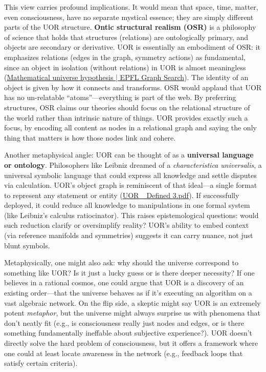 \documentclass[12pt]{article}
\begin{document}
This view carries profound implications. It would mean that space, time, matter, even consciousness, have no separate mystical essence; they are simply different parts of the UOR structure. \textbf{Ontic structural realism (OSR)} is a philosophy of science that holds that structures (relations) are ontologically primary, and objects are secondary or derivative. UOR is essentially an embodiment of OSR: it emphasizes relations (edges in the graph, symmetry actions) as fundamental, since an object in isolation (without relations) in UOR is almost meaningless (\href{https://graphsearch.epfl.ch/concept/2148329#:~:text=theory%20can%20be%20considered%20a,claims%20that%20the%20hypothesis%20has}{Mathematical universe hypothesis | EPFL Graph Search}). The identity of an object is given by how it connects and transforms. OSR would applaud that UOR has no un-relatable “atoms”---everything is part of the web. By preferring structures, OSR claims our theories should focus on the relational structure of the world rather than intrinsic nature of things. UOR provides exactly such a focus, by encoding all content as nodes in a relational graph and saying the only thing that matters is how those nodes link and cohere.

\medskip

Another metaphysical angle: UOR can be thought of as a \textbf{universal language or ontology}. Philosophers like Leibniz dreamed of a \emph{characteristica universalis}, a universal symbolic language that could express all knowledge and settle disputes via calculation. UOR’s object graph is reminiscent of that ideal---a single format to represent any statement or entity (\href{file://file-3oEyMHjK5WgHWfYmLyzhts#:~:text=Introduction%3A%20The%20Universal%20Object%20Reference,Originally%20formulated%20in%20computational%20and}{UOR\_ Defined 3.pdf}). If successfully deployed, it could reduce all knowledge to manipulations in one formal system (like Leibniz’s calculus ratiocinator). This raises epistemological questions: would such reduction clarify or oversimplify reality? UOR’s ability to embed context (via reference manifolds and symmetries) suggests it can carry nuance, not just blunt symbols.

\medskip

Metaphysically, one might also ask: why should the universe correspond to something like UOR? Is it just a lucky guess or is there deeper necessity? If one believes in a rational cosmos, one could argue that UOR is a discovery of an existing order---that the universe behaves as if it's executing an algorithm on a vast algebraic network. On the flip side, a skeptic might say UOR is an extremely potent \emph{metaphor}, but the universe might always surprise us with phenomena that don’t neatly fit (e.g., is consciousness really just nodes and edges, or is there something fundamentally ineffable about subjective experience?). UOR doesn’t directly solve the hard problem of consciousness, but it offers a framework where one could at least locate awareness in the network (e.g., feedback loops that satisfy certain criteria).
\end{document}
